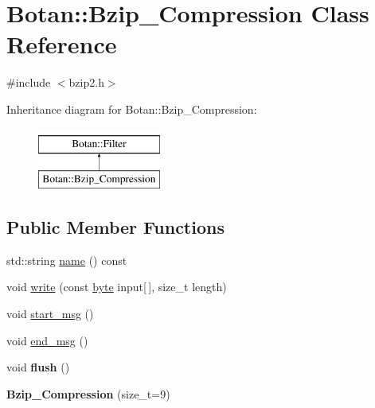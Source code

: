 \hypertarget{classBotan_1_1Bzip__Compression}{\section{Botan\-:\-:Bzip\-\_\-\-Compression Class Reference}
\label{classBotan_1_1Bzip__Compression}
}


{\ttfamily \#include $<$bzip2.\-h$>$}

Inheritance diagram for Botan\-:\-:Bzip\-\_\-\-Compression\-:\begin{figure}[H]
\begin{center}
\leavevmode
\includegraphics[height=2.000000cm]{classBotan_1_1Bzip__Compression}
\end{center}
\end{figure}
\subsection*{Public Member Functions}
\begin{DoxyCompactItemize}
\item 
std\-::string \hyperlink{classBotan_1_1Bzip__Compression_a2bb3e76efea9505fee7793f32bc8efea}{name} () const 
\item 
void \hyperlink{classBotan_1_1Bzip__Compression_a9022d2312d8451c9d0ebf4b85310f50b}{write} (const \hyperlink{namespaceBotan_a7d793989d801281df48c6b19616b8b84}{byte} input\mbox{[}$\,$\mbox{]}, size\-\_\-t length)
\item 
void \hyperlink{classBotan_1_1Bzip__Compression_a393495147879cd31d9896e057adad98b}{start\-\_\-msg} ()
\item 
void \hyperlink{classBotan_1_1Bzip__Compression_a6a35855f0867ba072b842b3188398376}{end\-\_\-msg} ()
\item 
\hypertarget{classBotan_1_1Bzip__Compression_a09990dd024a3405e1df5216909e93bb5}{void {\bfseries flush} ()}\label{classBotan_1_1Bzip__Compression_a09990dd024a3405e1df5216909e93bb5}

\item 
\hypertarget{classBotan_1_1Bzip__Compression_ae8eaeb1637da9b98a3927d1d96491ca8}{{\bfseries Bzip\-\_\-\-Compression} (size\-\_\-t=9)}\label{classBotan_1_1Bzip__Compression_ae8eaeb1637da9b98a3927d1d96491ca8}

\end{DoxyCompactItemize}

